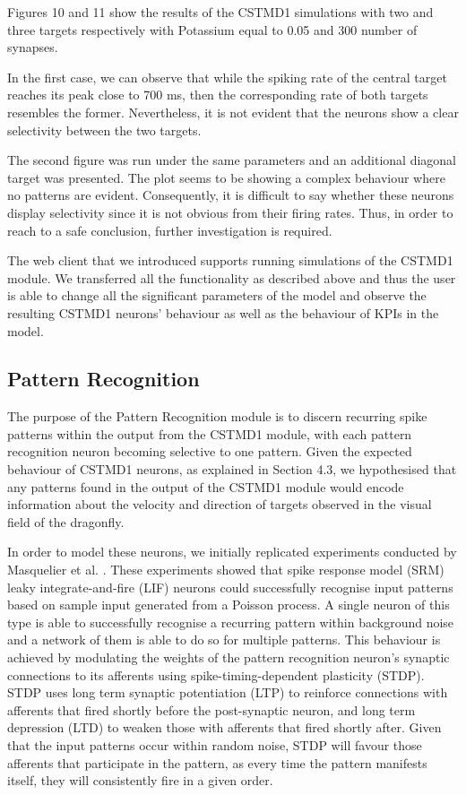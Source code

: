 \documentclass[a4paper,11pt]{article}
\begin{document}
Figures 10 and 11 show the results of the CSTMD1 simulations with two and three targets respectively with Potassium equal to 0.05 and 300 number of synapses. 

In the first case, we can observe that while the spiking rate of the central target reaches its peak close to 700 ms, then the corresponding rate of both targets resembles the former. Nevertheless, it is not evident that the neurons show a clear selectivity between the two targets.

The second figure was run under the same parameters and an additional diagonal target was presented. The plot seems to be showing a complex behaviour where no patterns are evident. Consequently, it is difficult to say whether these neurons display selectivity since it is not obvious from their firing rates. Thus, in order to reach to a safe conclusion, further investigation is required.

The web client that we introduced supports running simulations of the CSTMD1 module. We transferred all the functionality as described above and thus the user is able to change all the significant parameters of the model and observe the resulting CSTMD1 neurons' behaviour as well as the behaviour of KPIs in the model.

\subsection{Pattern Recognition}

The purpose of the Pattern Recognition module is to discern recurring spike patterns within the output from the CSTMD1 module, with each pattern recognition neuron becoming selective to one pattern. Given the expected behaviour of CSTMD1 neurons, as explained in Section 4.3, we hypothesised that any patterns found in the output of the CSTMD1 module would encode information about the velocity and direction of targets observed in the visual field of the dragonfly.\par

	In order to model these neurons, we initially replicated experiments conducted by Masquelier et al. \cite{stdp2} \cite{stdp1}. These experiments showed that spike response model (SRM) leaky integrate-and-fire (LIF) neurons could successfully recognise input patterns based on sample input generated from a Poisson process. A single neuron of this type is able to successfully recognise a recurring pattern within background noise and a network of them is able to do so for multiple patterns. This behaviour is achieved by modulating the weights of the pattern recognition neuron's synaptic connections to its afferents using spike-timing-dependent plasticity (STDP). STDP uses long term synaptic potentiation (LTP) to reinforce connections with afferents that fired shortly before the post-synaptic neuron, and long term depression (LTD) to weaken those with afferents that fired shortly after. Given that the input patterns occur within random noise, STDP will favour those afferents that participate in the pattern, as every time the pattern manifests itself, they will consistently fire in a given order.
\end{document}
